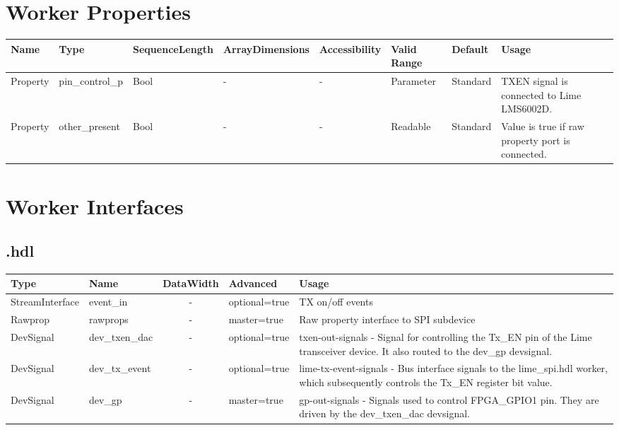 \begin{landscape}
  \section*{Worker Properties}
  \begin{scriptsize}
    \begin{tabular}{|p{2.5cm}|p{1.5cm}|p{2cm}|p{2.75cm}|p{1.5cm}|p{1.5cm}|p{1.2cm}|p{6.74cm}|}
      \hline
      \rowcolor{blue}
      Name               & Type & SequenceLength & ArrayDimensions & Accessibility      & Valid Range & Default & Usage                                                                               \\
      \hline
      Property & pin\_control\_p 	& Bool 	& - 				& - 				& Parameter		& Standard 		& TXEN signal is connected to Lime LMS6002D. \\
      \hline
      Property & other\_present 	& Bool 	& - 				& - 				& Readable 		& Standard 		& Value is true if raw property port is connected. \\
      \hline
    \end{tabular}
  \end{scriptsize}

  \section*{Worker Interfaces}
  \subsection*{\comp.hdl}
	\begin{scriptsize}
		\begin{tabular}{|M{3cm}|M{1.5cm}|c|M{3cm}|M{12cm}|}
			\hline
			Type            & Name 		& DataWidth & Advanced   	& Usage                                    	\\
			\hline
			StreamInterface & event\_in & -        	& optional=true	& TX on/off events							\\
			\hline
			Rawprop 		& rawprops  & -       	& master=true   & Raw property interface to SPI subdevice	\\
			\hline
			DevSignal & dev\_txen\_dac  & -    & optional=true    &  txen-out-signals - Signal for controlling the Tx\_EN pin of the Lime transceiver device. It also routed to the dev\_gp devsignal. \\
			\hline
			DevSignal & dev\_tx\_event  & -   & optional=true      &  lime-tx-event-signals - Bus interface signals to the lime\_spi.hdl worker, which subsequently controls the Tx\_EN register bit value.\\
			\hline
			DevSignal & dev\_gp  & -   & master=true     &  gp-out-signals - Signals used to control FPGA\_GPIO1 pin. They are driven by the dev\_txen\_dac devsignal. \\
			\hline
		\end{tabular}
	\end{scriptsize}

\end{landscape}

